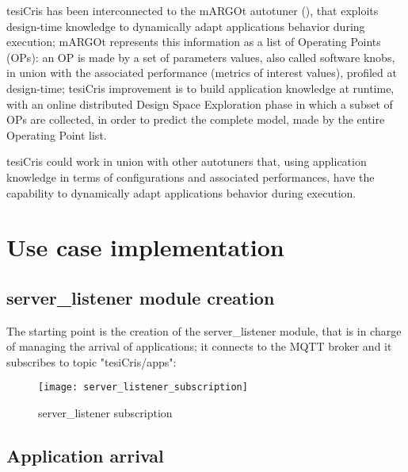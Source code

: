tesiCris has been interconnected to the mARGOt autotuner (\cite{gadioli2015application}), that exploits design-time knowledge to dynamically adapt applications behavior during execution; mARGOt represents this information as a list of Operating Points (OPs): an OP is made by a set of parameters values, also called software knobs, in union with the associated performance (metrics of interest values), profiled at design-time; tesiCris improvement is to build application knowledge at runtime, with an online distributed Design Space Exploration phase in which a subset of OPs are collected, in order to predict the complete model, made by the entire Operating Point list.

tesiCris could work in union with other autotuners that, using application knowledge in terms of configurations and associated performances, have the capability to dynamically adapt applications behavior during execution.










\section{Use case implementation}





\subsection{server\_listener module creation}

The starting point is the creation of the server\_listener module, that is in charge of managing the arrival of applications; it connects to the MQTT broker and it subscribes to topic "tesiCris/apps":

\begin{figure}[H]

    \centering
    \texttt{[image: server\_listener\_subscription]}
    \caption{server\_listener subscription}
    
\end{figure}





\subsection{Application arrival}

